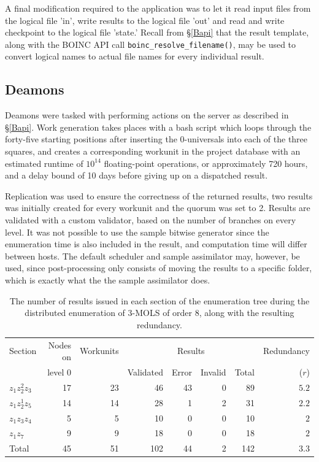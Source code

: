 A final modification required to the application was to let it read input files from the logical file  'in', write results to the logical file  'out' and read and write checkpoint to the logical file 'state.' Recall from \S\ref{Bapi} that the result template, along with the BOINC API call \verb|boinc_resolve_filename()|, may be used to convert logical names to actual file names for every individual result.

\subsection{Deamons} \label{5deamons}
Deamons were tasked with performing actions on the server as described in \S\ref{Bapi}. Work generation takes places with a bash \cite{bash} script which loops through the forty-five starting positions after inserting the 0-universals into each of the three squares, and creates a corresponding workunit in the project database with an estimated runtime of $10^{14}$ floating-point operations, or approximately 720 hours, and a delay bound of 10 days  before giving up on a dispatched result.

Replication was used to ensure the correctness of the returned results, two results was initially created for every workunit and the quorum was set to 2. Results are validated with a custom validator, based on the number of branches on every level. It was not possible to use the sample bitwise generator since the enumeration time is also included in the result, and computation time will differ between hosts.
The default scheduler and sample assimilator may, however, be used, since post-processing only consists of moving the results to a specific folder, which is exactly what the the sample assimilator does. 
 
  \begin{table}[htb]
 \centering
 \caption{The number of results issued in each section of the enumeration tree during the distributed enumeration of 3-MOLS of order 8, along with the resulting redundancy.}
\begin{tabular}{lrrrrrrr}
\toprule
Section & Nodes on    & Workunits & \multicolumn{4}{c}{Results} & Redundancy  \\
\cmidrule(lr){4-7}
 &level 0 && Validated & Error  & Invalid & Total &($r$)      \\ \midrule 
$z_1z_2^2z_3$ & 17& 23&46&43& 0& 89&$5.2$  \\ 
$z_1z_2^1z_5$ &14&14&28&1& 2&31&$2.2$   \\ 
$z_1z_3z_4$& 5&5&10&0&0&10& $2$    \\ 
$z_1z_7$ & 9&9&18&0&0&18&$2$   \\ \midrule
Total &45 &51&102&44&2&142&$3.3$   \\ \bottomrule
\end{tabular}\vspace*{.4cm}
\label{83naivesumm}
\end{table} 
